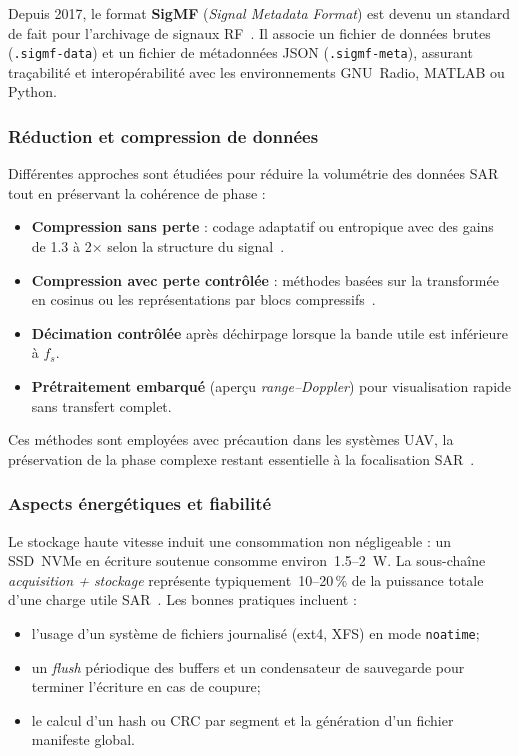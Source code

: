 Depuis 2017, le format \textbf{SigMF} (\textit{Signal Metadata Format}) est devenu un standard de fait pour l’archivage de signaux RF~\cite{Balister2017_SigMF}. Il associe un fichier de données brutes (\texttt{.sigmf-data}) et un fichier de métadonnées JSON (\texttt{.sigmf-meta}), assurant traçabilité et interopérabilité avec les environnements GNU~Radio, MATLAB ou Python.

\subsubsection{Réduction et compression de données}

Différentes approches sont étudiées pour réduire la volumétrie des données SAR tout en préservant la cohérence de phase :
\begin{itemize}
  \item \textbf{Compression sans perte} : codage adaptatif ou entropique avec des gains de 1.3 à 2× selon la structure du signal~\cite{Pieterse2019_SARcompressionMetrics}.
  \item \textbf{Compression avec perte contrôlée} : méthodes basées sur la transformée en cosinus ou les représentations par blocs compressifs~\cite{Choi2021_DroneSARcompression, Kim2025_SARcompressionPointClouds}.
  \item \textbf{Décimation contrôlée} après déchirpage lorsque la bande utile est inférieure à $f_s$.
  \item \textbf{Prétraitement embarqué} (aperçu \textit{range--Doppler}) pour visualisation rapide sans transfert complet.
\end{itemize}

Ces méthodes sont employées avec précaution dans les systèmes UAV, la préservation de la phase complexe restant essentielle à la focalisation SAR~\cite{Svedin2021_UAVSAR}.

\subsubsection{Aspects énergétiques et fiabilité}

Le stockage haute vitesse induit une consommation non négligeable : un SSD~NVMe en écriture soutenue consomme environ~1.5--2~W. La sous-chaîne \textit{acquisition + stockage} représente typiquement~10--20\,\% de la puissance totale d’une charge utile SAR~\cite{Sun2020_PassiveUAVSAR}. Les bonnes pratiques incluent :
\begin{itemize}
  \item l’usage d’un système de fichiers journalisé (ext4, XFS) en mode \texttt{noatime};
  \item un \textit{flush} périodique des buffers et un condensateur de sauvegarde pour terminer l’écriture en cas de coupure;
  \item le calcul d’un hash ou CRC par segment et la génération d’un fichier manifeste global.
\end{itemize}

